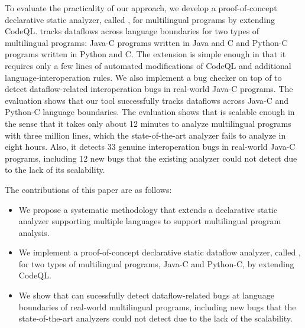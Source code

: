 To evaluate the practicality of our approach, we develop a proof-of-concept
declarative static analyzer, called \ours, for multilingual programs by
extending CodeQL. \ours tracks dataflows across language boundaries for two
types of
multilingual programs: Java-C programs written in Java and C and Python-C
programs written in Python and C. The extension is simple enough in that
it requires only a few lines of automated modifications of CodeQL and additional
language-interoperation rules. We also implement a bug checker on top of
\ours to detect dataflow-related interoperation bugs in real-world Java-C programs.
The evaluation shows that our tool successfully tracks dataflows across
Java-C and Python-C language boundaries. 
The evaluation shows that \ours is scalable enough in the sense that it takes
only about 12 minutes to analyze multilingual programs with three million
lines, which the state-of-the-art analyzer fails to analyze in eight hours.
Also, it detects 33 genuine interoperation bugs in real-world Java-C programs,
including 12 new bugs that the existing analyzer could not detect due to the
lack of its scalability.

The contributions of this paper are as follows:
\begin{itemize}
\item We propose a systematic methodology that extends a declarative static analyzer
supporting multiple languages to support multilingual program analysis.

\item We implement a proof-of-concept declarative static dataflow analyzer,
called \ours, for two types of multilingual programs, Java-C and Python-C, by
extending CodeQL.

\item We show that \ours can sucessfully detect dataflow-related bugs at
language boundaries of real-world multilingual programs, including new bugs
that the state-of-the-art analyzers could not detect due to the lack of the
scalability.

\end{itemize}

